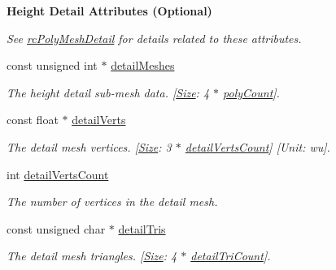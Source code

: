 \begin{Indent}\textbf{ Height Detail Attributes (Optional)}\par
{\em See \hyperlink{structrcPolyMeshDetail}{rc\+Poly\+Mesh\+Detail} for details related to these attributes. }\begin{DoxyCompactItemize}
\item 
\mbox{\label{structdtNavMeshCreateParams_a80fc57ad6c117b7b15edaa75c8b4cfa2}} 
const unsigned int $\ast$ \hyperlink{structdtNavMeshCreateParams_a80fc57ad6c117b7b15edaa75c8b4cfa2}{detail\+Meshes}
\begin{DoxyCompactList}\small\item\em The height detail sub-\/mesh data. \mbox{[}\hyperlink{classSize}{Size}\+: 4 $\ast$ \hyperlink{structdtNavMeshCreateParams_ade05d506a6505335142d06f18a35cc45}{poly\+Count}\mbox{]}. \end{DoxyCompactList}\item 
\mbox{\label{structdtNavMeshCreateParams_a33d048928b41300688a12f1a67b16a8a}} 
const float $\ast$ \hyperlink{structdtNavMeshCreateParams_a33d048928b41300688a12f1a67b16a8a}{detail\+Verts}
\begin{DoxyCompactList}\small\item\em The detail mesh vertices. \mbox{[}\hyperlink{classSize}{Size}\+: 3 $\ast$ \hyperlink{structdtNavMeshCreateParams_af3b5721cfa7cc46e508c5756116f7e10}{detail\+Verts\+Count}\mbox{]} \mbox{[}Unit\+: wu\mbox{]}. \end{DoxyCompactList}\item 
\mbox{\label{structdtNavMeshCreateParams_af3b5721cfa7cc46e508c5756116f7e10}} 
int \hyperlink{structdtNavMeshCreateParams_af3b5721cfa7cc46e508c5756116f7e10}{detail\+Verts\+Count}
\begin{DoxyCompactList}\small\item\em The number of vertices in the detail mesh. \end{DoxyCompactList}\item 
\mbox{\label{structdtNavMeshCreateParams_afd6f5b4f5fd48ddc8cfdb55930b0e5f5}} 
const unsigned char $\ast$ \hyperlink{structdtNavMeshCreateParams_afd6f5b4f5fd48ddc8cfdb55930b0e5f5}{detail\+Tris}
\begin{DoxyCompactList}\small\item\em The detail mesh triangles. \mbox{[}\hyperlink{classSize}{Size}\+: 4 $\ast$ \hyperlink{structdtNavMeshCreateParams_a2516fa677dad99e0859ed46615d64730}{detail\+Tri\+Count}\mbox{]}. \end{DoxyCompactList}\item 

\end{DoxyCompactItemize}
\end{Indent}
